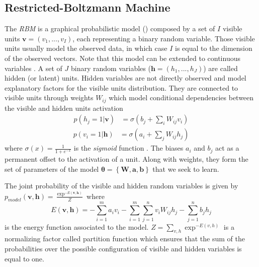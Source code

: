 \documentclass[letterpaper]{article}
\begin{document}
\subsection{Restricted-Boltzmann Machine}
The \textit{RBM} \cite{hinton2006fast} is a graphical probabilistic model () composed by a set of $I$ visible units $\bm{v} = (v_{1},...,v_{I})$, each representing a binary random variable. Those visible units usually model the observed data, in which case $I$ is equal to the dimension of the observed vectors. Note that this model can be extended to continuous variables \cite{hinton2010practical}. A set of $J$ binary random variables ($\bm{h} = (h_{1},...,h_{J})$) are called hidden (or latent) units. Hidden variables are not directly observed and model explanatory factors for the visible units distribution. They are connected to visible units through weights $W_{ij}$ which model conditional dependencies between the visible and hidden units activation
\begin{align}
\label{eq:marginal_RBM_1}
p(h_{j}=1|\bm{v}) &= \sigma \left( b_{j} + \sum_{i}W_{ij}v_{i} \right)
\end{align}
\begin{align}
\label{eq:marginal_RBM_2}
p(v_{i}=1|\bm{h}) &= \sigma \left( a_{i} + \sum_{j}W_{ij}h_{j} \right)
\end{align}
where $\sigma	(x) = \frac{1}{1+e^{-x}}$ is the \textit{sigmoid} function . The biases $a_{i}$ and $b_{j}$ act as a permanent offset to the activation of a unit. Along with weights, they form the set of parameters of the model $\bm{\theta} = \left\lbrace \bm{W} , \bm{a} , \bm{b} \right\rbrace$ that we seek to learn.

The joint probability of the visible and hidden random variables is given by $p_{model}(\bm{v},\bm{h}) = \frac{\exp^{-E(\bm{v},\bm{h})}}{Z}$ where
\begin{equation}
\label{eq:energy}
E(\bm{v},\bm{h}) = - \sum_{i=1}^{m} a_{i} v_{i}  - \sum_{i=1}^{m} \sum_{j=1}^{n} v_{i} W_{ij} h_{j} - \sum_{j = 1}^{n} b_{j} h_{j}
\end{equation}
is the energy function associated to the model. $Z = \sum_{v,h}\exp^{-E(v,h)}$ is a normalizing factor called partition function which ensures that the sum of the probabilities over the possible configuration of visible and hidden variables is equal to one.
\end{document}
